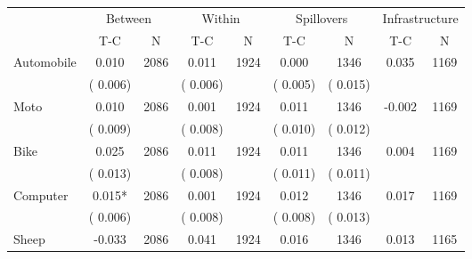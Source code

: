 
\begin{tabular}{l*{8}{c}}\hline&\multicolumn{2}{c}{Between}&\multicolumn{2}{c}{Within}&\multicolumn{2}{c}{Spillovers}&\multicolumn{2}{c}{Infrastructure}\\ \cmidrule(r){2-3}\cmidrule(l){4-5}\cmidrule(l){6-7}\cmidrule(l){8-9} & {T-C} & {N} & {T-C} & {N}  & {T-C}  & {N} & {T-C}  & {N} \\ \midrule
Automobile        &              0.010      &       2086       &              0.011      &       1924       &              0.000      &       1346  &        0.035 &       1169       \\
                       &       (       0.006)            &                               &       (       0.006)            &                               &       (       0.005)            &       (       0.015) &                  \\
Moto        &              0.010      &       2086       &              0.001      &       1924       &              0.011      &       1346  &       -0.002 &       1169       \\
                       &       (       0.009)            &                               &       (       0.008)            &                               &       (       0.010)            &       (       0.012) &                  \\
Bike        &              0.025      &       2086       &              0.011      &       1924       &              0.011      &       1346  &        0.004 &       1169       \\
                       &       (       0.013)            &                               &       (       0.008)            &                               &       (       0.011)            &       (       0.011) &                  \\
Computer        &              0.015*      &       2086       &              0.001      &       1924       &              0.012      &       1346  &        0.017 &       1169       \\
                       &       (       0.006)            &                               &       (       0.008)            &                               &       (       0.008)            &       (       0.013) &                  \\
Sheep        &             -0.033      &       2086       &              0.041      &       1924       &              0.016      &       1346  &        0.013 &       1165       \\

\end{tabular}
